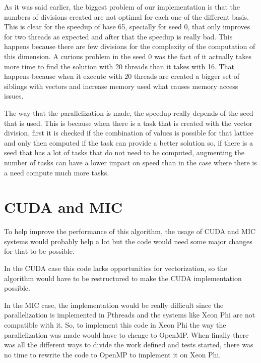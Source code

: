 \documentclass[conference]{IEEEtran}
\begin{document}
As it was said earlier, the biggest problem of our implementation is that the numbers of divisions created are not optimal for each one of the different basis. This is clear for the speedup of base 65, specially for seed 0, that only improves for two threads as expected and after that the speedup is really bad. This happens because there are few divisions for the complexity of the computation of this dimension. A curious problem in the seed 0 was the fact of it actually takes more time to find the solution with 20 threads than it takes with 16. That happens because when it execute with 20 threads are created a bigger set of siblings with vectors and increase memory used what causes memory access issues. 

The way that the parallelization is made, the speedup really depends of the seed that is used. This is because when there is a task that is created with the vector division, first it is checked if the combination of values is possible for that lattice and only then computed if the task can provide a better solution so, if there is a seed that has a lot of tasks that do not need to be computed, augmenting the number of tasks can have a lower impact on speed than in the case where there is a need compute much more tasks.

\section{CUDA and MIC}
To help improve the performance of this algorithm, the usage of CUDA and MIC systems would probably help a lot but the code would need some major changes for that to be possible.

In the CUDA case this code lacks opportunities for vectorization, so the algorithm would have to be restructured to make the CUDA implementation possible.

In the MIC case, the implementation would be really difficult since the parallelization is implemented in Pthreads and the systems like Xeon Phi are not compatible with it. So, to implement this code in Xeon Phi the way the parallelization was made would have to chenge to OpenMP. When finally there was all the different ways to divide the work defined and tests started, there was no time to rewrite the code to OpenMP to implement it on Xeon Phi.
\end{document}
